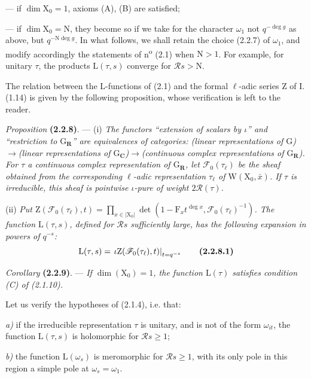 \documentclass[11pt,leqno]{article}
\begin{document}
— if \(\dim\mathrm X_0=1\), axioms (A), (B) are satisfied;

— if \(\dim\mathrm X_0=\mathrm N\), they become so if we take for the character \(\omega_1\) not \(q^{-\deg g}\) as above, but \(q^{-\mathrm N\deg g}\). In what follows, we shall retain the choice (2.2.7) of \(\omega_1\), and modify accordingly the statements of n\textsuperscript{o} (2.1) when \(\mathrm N>1\). For example, for unitary \(\tau\), the products \(\mathrm L(\tau,s)\) converge for \(\mathscr R s>\mathrm N\).

The relation between the \(\mathrm L\)-functions of (2.1) and the formal \(\ell\)-adic series \(\mathrm Z\) of I.\,(1.14) is given by the following proposition, whose verification is left to the reader.

\textit{Proposition} \textbf{(2.2.8)}. — (i) \textit{The functors “extension of scalars by \(\iota\)” and “restriction to \(\mathrm G_{\mathbf R}\)” are equivalences of categories: (linear representations of \(\mathrm G\))\(\to\)(linear representations of \(\mathrm G_{\mathbf C}\))\(\to\)(continuous complex representations of \(\mathrm G_{\mathbf R}\)). For \(\tau\) a continuous complex representation of \(\mathrm G_{\mathbf R}\), let \(\mathscr F_0(\tau_\ell)\) be the sheaf obtained from the corresponding \(\ell\)-adic representation \(\tau_\ell\) of \(\mathrm W(\mathrm X_0,\bar{x})\). If \(\tau\) is irreducible, this sheaf is pointwise \(\iota\)-pure of weight \(2\mathscr R(\tau)\).}

(ii) \textit{Put \(\mathrm Z(\mathscr F_0(\tau_\ell),t)=\prod\limits_{x\in|\mathrm X_0|}\det(1-\mathrm F_xt^{\deg x},\mathscr F_0(\tau_\ell)^{-1})\). The function \(\mathrm L(\tau,s)\), defined for \(\mathscr R s\) sufficiently large, has the following expansion in powers of \(q^{-s}\):}
\[
\mathrm L(\tau,s)
=\left.\iota\mathrm Z(\mathscr F_0(\tau_\ell),t)\right|_{t=q^{-s}}
\tag*{\textbf{(2.2.8.1)}}
\]

\textit{Corollary} \textbf{(2.2.9)}. — \textit{If \(\dim(\mathrm X_0)=1\), the function \(\mathrm L(\tau)\) satisfies condition \textup{(C)} of \textup{(2.1.10)}.}

Let us verify the hypotheses of (2.1.4), i.e. that:

\textit{a)} if the irreducible representation \(\tau\) is unitary, and is not of the form \(\omega_{it}\), the function \(\mathrm L(\tau,s)\) is holomorphic for \(\mathscr R s\geq1\);

\textit{b)} the function \(\mathrm L(\omega_s)\) is meromorphic for \(\mathscr R s\geq1\), with its only pole in this region a simple pole at \(\omega_s=\omega_1\).
\end{document}
